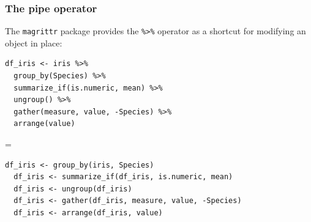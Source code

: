 \documentclass{beamer}
\begin{document}
	\begin{frame}[fragile]
		\frametitle{The pipe operator}

		The \verb|magrittr| package provides the \Verb|%>%| operator as a shortcut for modifying an object in place:

		\vspace{1em}

		\begin{exampleblock}{}
		\begin{BVerbatim}
df_iris <- iris %>%
  group_by(Species) %>%
  summarize_if(is.numeric, mean) %>%
  ungroup() %>%
  gather(measure, value, -Species) %>%
  arrange(value)
		\end{BVerbatim}
		\end{exampleblock}{}

		=

		\begin{exampleblock}{}
		\begin{BVerbatim}
df_iris <- group_by(iris, Species)
  df_iris <- summarize_if(df_iris, is.numeric, mean)
  df_iris <- ungroup(df_iris)
  df_iris <- gather(df_iris, measure, value, -Species)
  df_iris <- arrange(df_iris, value)
		\end{BVerbatim}
		\end{exampleblock}{}

	\end{frame}
\end{document}
